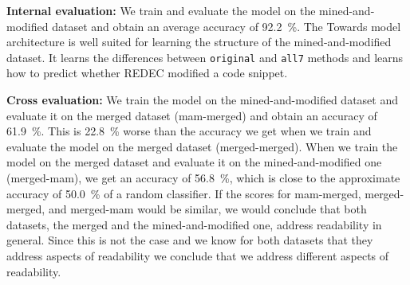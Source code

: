 \documentclass[%
class=scrreprt,
chapterprefix=false,%
open=right,%
twoside=true,%
paper=a4,%
logofile={Logo\_zentral\_farbig\_EN.png},%
thesistype=master,%
UKenglish,%
]{se2thesis}
\theoremstyle{definition}
\newcommand{\rdh}{REDEC\xspace}
\begin{document}
	\textbf{Internal evaluation:}
	We train and evaluate the model on the mined-and-modified dataset and obtain an average accuracy of 92.2~\%.
	The Towards model architecture is well suited for learning the structure of the mined-and-modified dataset. It learns the differences between \texttt{original} and \texttt{all7} methods and learns how to predict whether \rdh modified a code snippet. 

	\textbf{Cross evaluation:}
	We train the model on the mined-and-modified dataset and evaluate it on the merged dataset (mam-merged) and obtain an accuracy of 61.9~\%. This is 22.8~\% worse than the accuracy we get when we train and evaluate the model on the merged dataset (merged-merged). When we train the model on the merged dataset and evaluate it on the mined-and-modified one (merged-mam), we get an accuracy of 56.8~\%, which is close to the approximate accuracy of 50.0~\% of a random classifier.
	If the scores for mam-merged, merged-merged, and merged-mam would be similar, we would conclude that both datasets, the merged and the mined-and-modified one, address readability in general. Since this is not the case and we know for both datasets that they address aspects of readability we conclude that we address different aspects of readability.
	
	
	
\end{document}
